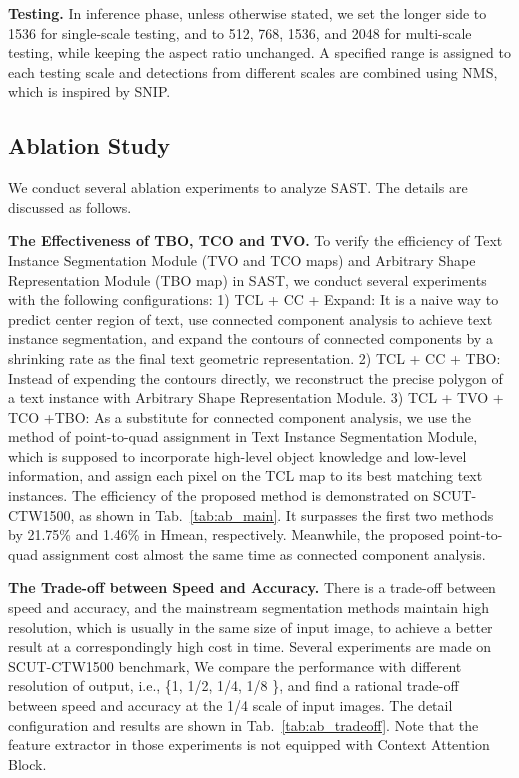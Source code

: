 \documentclass[sigconf]{acmart}
\begin{document}
\textbf{Testing.} In inference phase, unless otherwise stated, we set the longer side to 1536 for single-scale testing, and to 512, 768, 1536, and 2048 for multi-scale testing, while keeping the aspect ratio unchanged. A specified range is assigned to each testing scale and detections from different scales are combined using NMS, which is inspired by SNIP\cite{singh2018analysis}.



\subsection{Ablation Study}
We conduct several ablation experiments to analyze SAST. The details are discussed as follows.

\textbf{The Effectiveness of TBO, TCO and TVO.} To verify the efficiency of Text Instance Segmentation Module (TVO and TCO maps) and Arbitrary Shape Representation Module (TBO map) in SAST, we conduct several experiments with the following configurations: 1) TCL + CC + Expand: It is a naive way to predict center region of text, use connected component analysis to achieve text instance segmentation, and expand the contours of connected components by a shrinking rate as the final text geometric representation. 2) TCL + CC + TBO: Instead of expending the contours directly, we reconstruct the precise polygon of a text instance with Arbitrary Shape Representation Module. 3) TCL + TVO + TCO +TBO: As a substitute for connected component analysis, we use the method of point-to-quad assignment in Text Instance Segmentation Module, which is supposed to incorporate high-level object knowledge and low-level information, and assign each pixel on the TCL map to its best matching text instances. The efficiency of the proposed method is demonstrated on SCUT-CTW1500, as shown in Tab.~\ref{tab:ab_main}. It surpasses the first two methods by 21.75\% and 1.46\% in Hmean, respectively. Meanwhile, the proposed point-to-quad assignment cost almost the same time as connected component analysis.








\textbf{The Trade-off between Speed and Accuracy.}
There is a trade-off  between speed and accuracy, and the mainstream segmentation methods maintain high resolution, which is usually in the same size of input image, to achieve a better result at a correspondingly high cost in time. Several experiments are made on SCUT-CTW1500 benchmark, We compare the performance with different resolution of output, i.e., \{1, 1/2, 1/4, 1/8 \}, and find a rational trade-off between speed and accuracy at the 1/4 scale of input images. The detail configuration and results are shown in Tab.~\ref{tab:ab_tradeoff}. Note that the feature extractor in those experiments is not equipped with Context Attention Block.
\end{document}
